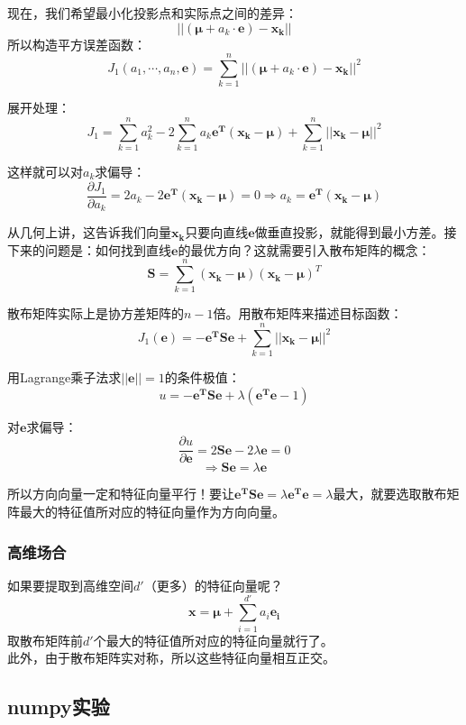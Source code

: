 \documentclass{article}
\begin{document}
现在，我们希望最小化投影点和实际点之间的差异：\\
\[ ||(\mathbf{\mu} + a_k \cdot \mathbf{e}) - \mathbf{x_k}|| \]
所以构造平方误差函数：\\
\[ J_1(a_1, \cdots, a_n, \mathbf{e}) = \sum_{k=1}^n ||(\mathbf{\mu} + a_k \cdot \mathbf{e}) - \mathbf{x_k}||^2  \]

展开处理：\\
\[ J_1 = \sum_{k=1}^n a_k^2 - 2\sum_{k=1}^n a_k \mathbf{e^T}(\mathbf{x_k - \mu}) + \sum_{k=1}^n ||\mathbf{x_k - \mu}||^2 \]

这样就可以对$a_k$求偏导：\\
\[ \frac{\partial J_1}{\partial a_k} = 2a_k - 2\mathbf{e^T}(\mathbf{x_k - \mu}) = 0 \Rightarrow a_k = \mathbf{e^T}(\mathbf{x_k - \mu}) \]

从几何上讲，这告诉我们向量$\mathbf{x_k}$只要向直线$\mathbf{e}$做垂直投影，就能得到最小方差。接下来的问题是：如何找到直线$\mathbf{e}$的最优方向？这就需要引入散布矩阵的概念：\\
\[ \mathbf{S} = \sum_{k=1}^n (\mathbf{x_k - \mu})(\mathbf{x_k - \mu})^T \]

散布矩阵实际上是协方差矩阵的$n-1$倍。用散布矩阵来描述目标函数：\\
\[ J_1(\mathbf{e}) = -\mathbf{e^TSe} + \sum_{k=1}^n ||\mathbf{x_k - \mu}||^2 \]

用Lagrange乘子法求$||\mathbf{e}||=1$的条件极值：\\
\[ u = -\mathbf{e^TSe} + \lambda \left( \mathbf{e^Te} - 1 \right) \]

对$\mathbf{e}$求偏导：\\
\[ \frac{\partial u}{\partial \mathbf{e}} = 2\mathbf{Se} - 2\lambda\mathbf{e} = 0 \]
\[ \Rightarrow  \mathbf{Se} = \lambda\mathbf{e} \]

所以方向向量一定和特征向量平行！要让$\mathbf{e^TSe} = \lambda\mathbf{e^Te} = \lambda$最大，就要选取散布矩阵最大的特征值所对应的特征向量作为方向向量。

\subsubsection{高维场合}
如果要提取到高维空间$d'$（更多）的特征向量呢？
\[ \mathbf{x = \mu} + \sum_{i=1}^{d'} a_i \mathbf{e_i} \]
取散布矩阵前$d'$个最大的特征值所对应的特征向量就行了。\\

此外，由于散布矩阵实对称，所以这些特征向量相互正交。

\subsection{numpy实验}
\end{document}

